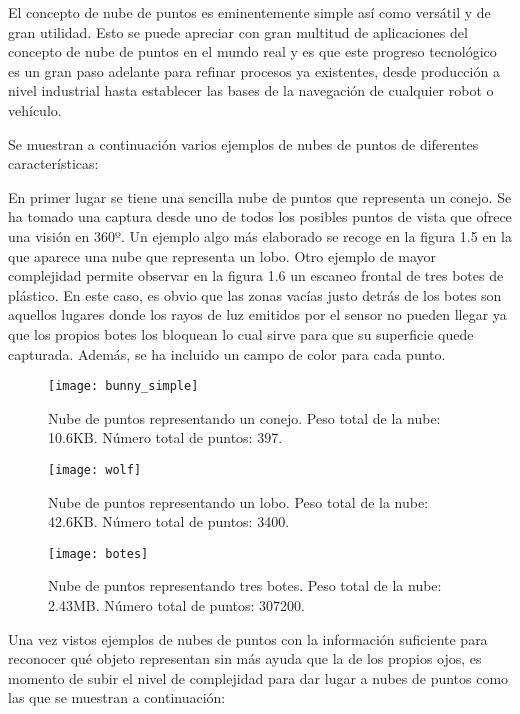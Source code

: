 El concepto de nube de puntos es eminentemente simple así como versátil y de gran utilidad. Esto se puede apreciar con gran multitud de aplicaciones del concepto de nube de puntos en el mundo real y es que este progreso tecnológico es un gran paso adelante para refinar procesos ya existentes, desde producción a nivel industrial hasta establecer las bases de la navegación de cualquier robot o vehículo.


Se muestran a continuación varios ejemplos de nubes de puntos de diferentes características:

En primer lugar se tiene una sencilla nube de puntos que representa un conejo. Se ha tomado una captura desde uno de todos los posibles puntos de vista que ofrece una visión en 360º.
Un ejemplo algo más elaborado se recoge en la figura 1.5 en la que aparece una nube que representa un lobo. 
Otro ejemplo de mayor complejidad permite observar en la figura 1.6 un escaneo frontal de tres botes de plástico. En este caso, es obvio que las zonas vacías justo detrás de los botes son aquellos lugares donde los rayos de luz emitidos por el sensor no pueden llegar ya que los propios botes los bloquean lo cual sirve para que su superficie quede capturada. Además, se ha incluido un campo de color para cada punto.


\begin{figure}[!htb]
  \texttt{[image: bunny\_simple]}
  \caption{Nube de puntos representando un conejo.
  Peso total de la nube: 10.6KB.
  Número total de puntos: 397.}\label{fig:bunny_simple}
\endminipage\hfill
{}
  \texttt{[image: wolf]}
  \caption{Nube de puntos representando un lobo.
  Peso total de la nube: 42.6KB.
  Número total de puntos: 3400.}\label{fig:wolf}
\endminipage\hfill
{}%
  \texttt{[image: botes]}
  \caption{Nube de puntos representando tres botes.
  Peso total de la nube: 2.43MB.
  Número total de puntos: 307200.}\label{fig:botes}
\endminipage
\end{figure}



Una vez vistos ejemplos de nubes de puntos con la información suficiente para reconocer qué objeto representan sin más ayuda que la de los propios ojos, es momento de subir el nivel de complejidad para dar lugar a nubes de puntos como las que se muestran a continuación:

